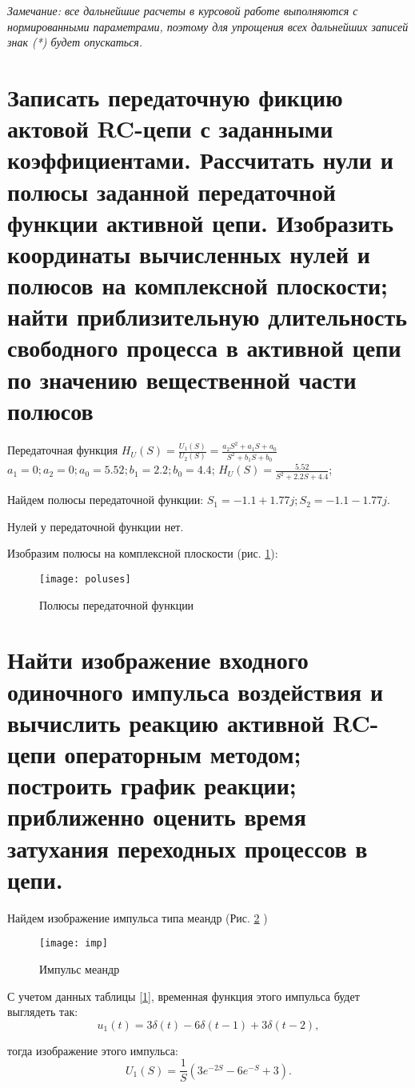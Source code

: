 \documentclass[a4paper,14pt ]{article} %
\begin{document}
    \it{Замечание}\normalfont: все дальнейшие расчеты в курсовой работе выполняются с нормированными параметрами, поэтому для упрощения всех дальнейших записей знак (*) будет опускаться.
    \section{Записать передаточную фикцию актовой RC-цепи с заданными коэффициентами. Рассчитать нули и полюсы заданной передаточной функции активной цепи. Изобразить координаты вычисленных нулей и полюсов на комплексной плоскости; найти приблизительную длительность свободного процесса в активной цепи по значению вещественной части полюсов}
    Передаточная функция $H_U(S) = \frac{U_1(S)}{U_2(S)} = \frac{a_2S^2 + a_1S + a_0}{S^2 + b_1S+b_0}$\\
    $a_1 = 0; a_2 = 0; a_0 = 5.52; b_1 = 2.2; b_0 = 4.4$;
    $H_U(S) = \frac{5.52}{S^2 + 2.2S+ 4.4}$;
    
    Найдем полюсы передаточной функции: 
        $S_1 = -1.1 + 1.77j; S_2 = -1.1 - 1.77j$.

    Нулей у передаточной функции нет.


    Изобразим полюсы на комплексной плоскости (рис. \ref{fig:1}):
    \begin{figure}[H]
        \texttt{[image: poluses]}
        \centering
        \caption{Полюсы передаточной функции}
        \label{fig:1}
    \end{figure} 
    \section{Найти изображение входного одиночного импульса воздействия и вычислить реакцию активной RC-цепи операторным методом; построить график реакции; приближенно оценить время затухания переходных процессов в цепи.}
    Найдем изображение импульса типа меандр (Рис. \ref{fig:2} )
    \begin{figure}[H]
        \texttt{[image: imp]}
        \centering
        \caption{Импульс меандр}
        \label{fig:2}
    \end{figure}
    С учетом данных таблицы \ref{1}, временная функция этого импульса будет выглядеть так:
    \begin{equation}
        u_1(t) = 3\delta (t) - 6\delta(t-1) + 3\delta(t-2),
    \end{equation}


    тогда изображение этого импульса:
    \begin{equation}
        U_1(S) = \frac{1}{S}\left(3e^{-2S} - 6e^{-S} + 3\right). 
    \end{equation}
\end{document}
